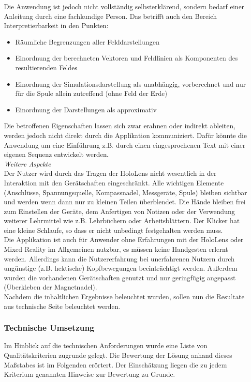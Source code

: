 Die Anwendung ist jedoch nicht vollständig selbsterklärend, sondern bedarf einer Anleitung durch eine fachkundige Person. Das betrifft auch den Bereich Interpretierbarkeit in den Punkten:
\begin{itemize}
	\setlength{\itemsep}{-1pt}
	\singlespacing
	\item Räumliche Begrenzungen aller Felddarstellungen
	\item Einordnung der berechneten Vektoren und Feldlinien als Komponenten des resultierenden Feldes
	\item Einordnung der Simulationsdarstellung als unabhängig, vorberechnet und nur für die Spule allein zutreffend (ohne Feld der Erde)
	\item Einordnung der Darstellungen als approximativ
\end{itemize}

Die betroffenen Eigenschaften lassen sich zwar erahnen oder indirekt ableiten, werden jedoch nicht direkt durch die Applikation kommuniziert. Dafür könnte die Anwendung um eine Einführung z.B. durch einen eingesprochenen Text mit einer eigenen Sequenz entwickelt werden.\\

\textit{Weitere Aspekte}\\
Der Nutzer wird durch das Tragen der HoloLens nicht wesentlich in der Interaktion mit den Gerätschaften eingeschränkt. Alle wichtigen Elemente (Anschlüsse, Spannungsquelle, Kompassnadel, Messgeräte, Spule) bleiben sichtbar und werden wenn dann nur zu kleinen Teilen überblendet. Die Hände bleiben frei zum Einstellen der Geräte, dem Anfertigen von Notizen oder der Verwendung weiterer Lehrmittel wie z.B. Lehrbüchern oder Arbeitsblättern. Der Klicker hat eine kleine Schlaufe, so dass er nicht unbedingt festgehalten werden muss.\\

Die Applikation ist auch für Anwender ohne Erfahrungen mit der HoloLens oder Mixed Reality im Allgemeinen nutzbar, es müssen keine Handgesten erlernt werden. Allerdings kann die Nutzererfahrung bei unerfahrenen Nutzern durch ungünstige (z.B. hektische) Kopfbewegungen beeinträchtigt werden. Außerdem wurden die vorhandenen Gerätschaften genutzt und nur geringfügig angepasst (Überkleben der Magnetnadel).\\

Nachdem die inhaltlichen Ergebnisse beleuchtet wurden, sollen nun die Resultate aus technische Seite beleuchtet werden.

\subsubsection{Technische Umsetzung}
Im Hinblick auf die technischen Anforderungen wurde eine Liste von Qualitätskriterien zugrunde gelegt. Die Bewertung der Lösung anhand dieses Maßstabes ist im Folgenden erörtert. Der Einschätzung liegen die zu jedem Kriterium genannten Hinweise zur Bewertung zu Grunde.\\

